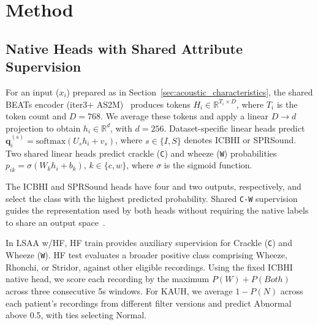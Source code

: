 \section{Method}
\label{sec:method}
\subsection{Native Heads with Shared Attribute Supervision}
\label{sec:annotation_alignment}
\label{sec:native_readouts}
For an input ($x_i$) prepared as in Section~\ref{sec:acoustic_characteristics}, the shared BEATs encoder (iter3+ AS2M)~\cite{chen2023beats,gemmeke2017audioset} produces tokens $H_i\in\mathbb{R}^{T_i\times D}$, where $T_i$ is the token count and $D=768$. We average these tokens and apply a linear $D\to d$ projection to obtain $h_i\in\mathbb{R}^{d}$, with $d=256$. Dataset-specific linear heads predict $\boldsymbol q_i^{(s)}=\mathrm{softmax}(U_sh_i+v_s)$, where $s\in\{I,S\}$ denotes ICBHI or SPRSound. Two shared linear heads predict crackle (\texttt{C}) and wheeze (\texttt{W}) probabilities $p_{ik}=\sigma(W_kh_i+b_k)$, $k\in\{c,w\}$, where $\sigma$ is the sigmoid function.

The ICBHI and SPRSound heads have four and two outputs, respectively, and select the class with the highest predicted probability. Shared \texttt{C-W} supervision guides the representation used by both heads without requiring the native labels to share an output space~\cite{caruana1997multitask}.

In LSAA w/HF, HF train provides auxiliary supervision for Crackle (\texttt{C}) and Wheeze (\texttt{W}). HF test evaluates a broader positive class comprising Wheeze, Rhonchi, or Stridor, against other eligible recordings. Using the fixed ICBHI native head, we score each recording by the maximum $P(W)+P(Both)$ across three consecutive 5s windows. For KAUH, we average $1-P(N)$ across each patient's recordings from different filter versions and predict Abnormal above 0.5, with ties selecting Normal.

